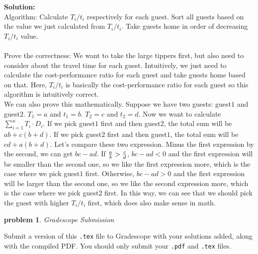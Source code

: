 \documentclass[10pt]{article}
\newcommand{\solution}[1]{\color{blue}\hfill\break\noindent\textbf{Solution:} #1\color{black}}
\newtheorem{problem}{\sc\color{cit}problem}
\begin{document}
\solution{ \\
    Algorithm: Calculate $T_i / t_i$ respectively for each guest. Sort all guests based on the value we just calculated from $T_i / t_i$. Take guests home in order of decreasing $T_i / t_i$ value.\\ \\
    Prove the correctness: We want to take the large tippers first, but also need to consider about the travel time for each guest. Intuitively, we just need to calculate the cost-performance ratio for each guest and take guests home based on that. Here, $T_i / t_i$ is basically the cost-performance ratio for each guest so this algorithm is intuitively correct. \\
    We can also prove this mathematically. Suppose we have two guests: guest$1$ and guest$2$. $T_1 = a$ and $t_1 = b$. $T_2 = c$ and $t_2 = d$. Now we want to calculate $\sum_{i=1}^{n} T_i \cdot D_i$. If we pick guest$1$ first and then guest$2$, the total sum will be $ab+c(b+d)$. If we pick guest$2$ first and then guest$1$, the total sum will be $cd+a(b+d)$. Let's compare these two expression. Minus the first expression by the second, we can get $bc-ad$. If ${a\over b} > {c\over d}$, $bc-ad < 0$ and the first expression will be smaller than the second one, so we like the first expression more, which is the case where we pick guest$1$ first. Otherwise, $bc-ad > 0$ and the first expression will be larger than the second one, so we like the second expression more, which is the case where we pick guest$2$ first. In this way, we can see that we should pick the guest with higher $T_i / t_i$ first, which does also make sense in math.
}

\begin{problem} Gradescope Submission \end{problem}
Submit a version of this \verb|.tex| file to Gradescope with your solutions added, along with the compiled PDF.  You should only submit your \verb|.pdf| and \verb|.tex| files.
\end{document}
